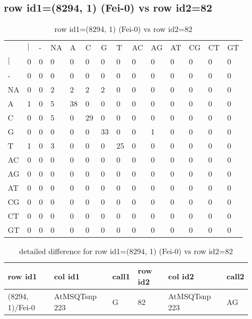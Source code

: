 \subsection{row id1=(8294, 1) (Fei-0) vs row id2=82}
\begin{center}
\begin{longtable}{|l|l|l|l|l|l|l|l|l|l|l|l|l|l|}
\caption{row id1=(8294, 1) (Fei-0) vs row id2=82} \label{table_dm462}\\
\hline
\\
\hline
&$|$&-&NA&A&C&G&T&AC&AG&AT&CG&CT&GT\\
$|$&0&0&0&0&0&0&0&0&0&0&0&0&0\\
-&0&0&0&0&0&0&0&0&0&0&0&0&0\\
NA&0&0&2&2&2&2&0&0&0&0&0&0&0\\
A&1&0&5&38&0&0&0&0&0&0&0&0&0\\
C&0&0&5&0&29&0&0&0&0&0&0&0&0\\
G&0&0&0&0&0&33&0&0&1&0&0&0&0\\
T&1&0&3&0&0&0&25&0&0&0&0&0&0\\
AC&0&0&0&0&0&0&0&0&0&0&0&0&0\\
AG&0&0&0&0&0&0&0&0&0&0&0&0&0\\
AT&0&0&0&0&0&0&0&0&0&0&0&0&0\\
CG&0&0&0&0&0&0&0&0&0&0&0&0&0\\
CT&0&0&0&0&0&0&0&0&0&0&0&0&0\\
GT&0&0&0&0&0&0&0&0&0&0&0&0&0\\
\hline
\end{longtable}
\end{center}

\begin{center}
\begin{longtable}{|l|l|l|l|l|l|}
\caption{detailed difference for row id1=(8294, 1) (Fei-0) vs row id2=82} \label{table_dm463}\\
\hline
row id1&col id1&call1&row id2&col id2&call2\\
\hline
(8294, 1)/Fei-0&AtMSQTsnp 223&G&82&AtMSQTsnp 223&AG\\
\hline
\end{longtable}
\end{center}

